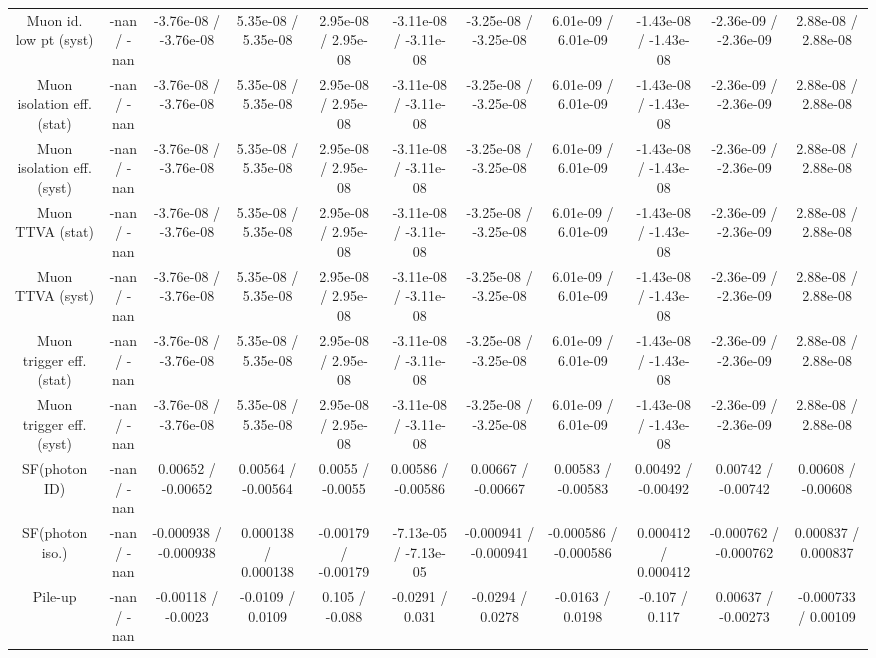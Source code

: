 \begin{table}[htbp]
\begin{center}
\begin{tabular}{|c|c|c|c|c|c|c|c|c|c|c|}
  Muon id. low pt (syst) & -nan / -nan & -3.76e-08 / -3.76e-08 & 5.35e-08 / 5.35e-08 & 2.95e-08 / 2.95e-08 & -3.11e-08 / -3.11e-08 & -3.25e-08 / -3.25e-08 & 6.01e-09 / 6.01e-09 & -1.43e-08 / -1.43e-08 & -2.36e-09 / -2.36e-09 & 2.88e-08 / 2.88e-08 \\ 
  Muon isolation eff. (stat) & -nan / -nan & -3.76e-08 / -3.76e-08 & 5.35e-08 / 5.35e-08 & 2.95e-08 / 2.95e-08 & -3.11e-08 / -3.11e-08 & -3.25e-08 / -3.25e-08 & 6.01e-09 / 6.01e-09 & -1.43e-08 / -1.43e-08 & -2.36e-09 / -2.36e-09 & 2.88e-08 / 2.88e-08 \\ 
  Muon isolation eff. (syst) & -nan / -nan & -3.76e-08 / -3.76e-08 & 5.35e-08 / 5.35e-08 & 2.95e-08 / 2.95e-08 & -3.11e-08 / -3.11e-08 & -3.25e-08 / -3.25e-08 & 6.01e-09 / 6.01e-09 & -1.43e-08 / -1.43e-08 & -2.36e-09 / -2.36e-09 & 2.88e-08 / 2.88e-08 \\ 
  Muon TTVA (stat) & -nan / -nan & -3.76e-08 / -3.76e-08 & 5.35e-08 / 5.35e-08 & 2.95e-08 / 2.95e-08 & -3.11e-08 / -3.11e-08 & -3.25e-08 / -3.25e-08 & 6.01e-09 / 6.01e-09 & -1.43e-08 / -1.43e-08 & -2.36e-09 / -2.36e-09 & 2.88e-08 / 2.88e-08 \\ 
  Muon TTVA (syst) & -nan / -nan & -3.76e-08 / -3.76e-08 & 5.35e-08 / 5.35e-08 & 2.95e-08 / 2.95e-08 & -3.11e-08 / -3.11e-08 & -3.25e-08 / -3.25e-08 & 6.01e-09 / 6.01e-09 & -1.43e-08 / -1.43e-08 & -2.36e-09 / -2.36e-09 & 2.88e-08 / 2.88e-08 \\ 
  Muon trigger eff. (stat) & -nan / -nan & -3.76e-08 / -3.76e-08 & 5.35e-08 / 5.35e-08 & 2.95e-08 / 2.95e-08 & -3.11e-08 / -3.11e-08 & -3.25e-08 / -3.25e-08 & 6.01e-09 / 6.01e-09 & -1.43e-08 / -1.43e-08 & -2.36e-09 / -2.36e-09 & 2.88e-08 / 2.88e-08 \\ 
  Muon trigger eff. (syst) & -nan / -nan & -3.76e-08 / -3.76e-08 & 5.35e-08 / 5.35e-08 & 2.95e-08 / 2.95e-08 & -3.11e-08 / -3.11e-08 & -3.25e-08 / -3.25e-08 & 6.01e-09 / 6.01e-09 & -1.43e-08 / -1.43e-08 & -2.36e-09 / -2.36e-09 & 2.88e-08 / 2.88e-08 \\ 
  SF(photon ID) & -nan / -nan & 0.00652 / -0.00652 & 0.00564 / -0.00564 & 0.0055 / -0.0055 & 0.00586 / -0.00586 & 0.00667 / -0.00667 & 0.00583 / -0.00583 & 0.00492 / -0.00492 & 0.00742 / -0.00742 & 0.00608 / -0.00608 \\ 
  SF(photon iso.) & -nan / -nan & -0.000938 / -0.000938 & 0.000138 / 0.000138 & -0.00179 / -0.00179 & -7.13e-05 / -7.13e-05 & -0.000941 / -0.000941 & -0.000586 / -0.000586 & 0.000412 / 0.000412 & -0.000762 / -0.000762 & 0.000837 / 0.000837 \\ 
  Pile-up & -nan / -nan & -0.00118 / -0.0023 & -0.0109 / 0.0109 & 0.105 / -0.088 & -0.0291 / 0.031 & -0.0294 / 0.0278 & -0.0163 / 0.0198 & -0.107 / 0.117 & 0.00637 / -0.00273 & -0.000733 / 0.00109 \\ 

\end{tabular}
\end{center}
\end{table}
